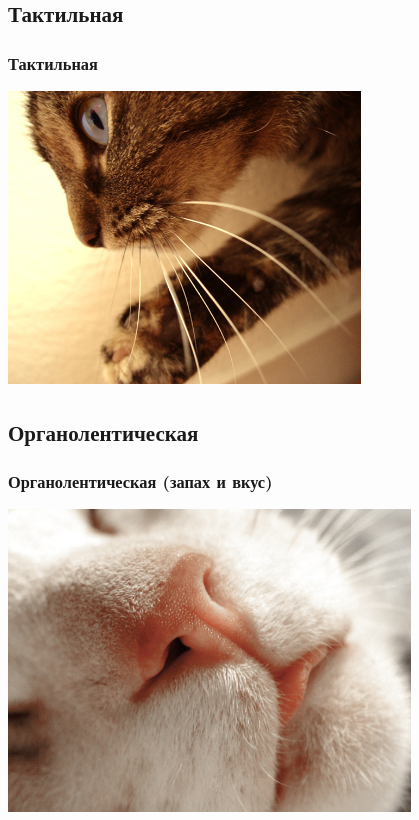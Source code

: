 \documentclass[compress,red]{beamer}
\begin{document}
\subsection{Тактильная}
\begin{frame}[fragile]
  \frametitle{Тактильная}
  \centerline{\includegraphics[width=0.7\textwidth]{images/cat_whiskers.jpeg}}
\end{frame}

\subsection{Органолентическая}
\begin{frame}[fragile]
  \frametitle{Органолентическая (запах и вкус)}
  \centerline{\includegraphics[width=0.8\textwidth]{images/cat_nail.jpeg}}
\end{frame}
\end{document}
